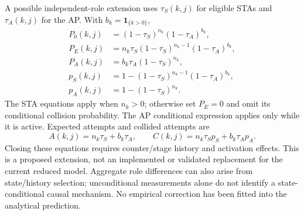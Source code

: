 \documentclass[11pt,a4paper]{article}
\newcommand{\ind}{\mathbf{1}}
\begin{document}
A possible independent-role extension uses $\tau_S(k,j)$ for eligible STAs
and $\tau_A(k,j)$ for the AP. With $b_k=\ind_{\{k>0\}}$,
\begin{align}
P_0(k,j)&=(1-\tau_S)^{n_k}(1-\tau_A)^{b_k},\\
P_E(k,j)&=n_k\tau_S(1-\tau_S)^{n_k-1}(1-\tau_A)^{b_k},\\
P_A(k,j)&=b_k\tau_A(1-\tau_S)^{n_k},\\
p_S(k,j)&=1-(1-\tau_S)^{n_k-1}(1-\tau_A)^{b_k},\\
p_A(k,j)&=1-(1-\tau_S)^{n_k}.
\end{align}
The STA equations apply when $n_k>0$; otherwise set $P_E=0$ and omit its
conditional collision probability. The AP conditional expression applies
only while it is active. Expected attempts and collided attempts are
\begin{equation}
A(k,j)=n_k\tau_S+b_k\tau_A,\qquad
C(k,j)=n_k\tau_Sp_S+b_k\tau_Ap_A.
\end{equation}
Closing these equations requires counter/stage history and activation effects.
This is a proposed extension, not an implemented or validated replacement
for the current reduced model. Aggregate role differences can also arise
from state/history selection; unconditional measurements alone do not
identify a state-conditional causal mechanism. No empirical correction has
been fitted into the analytical prediction.
\end{document}
